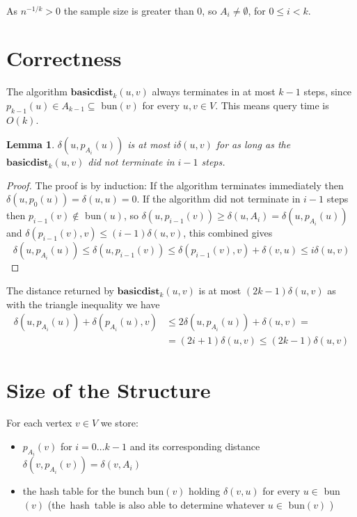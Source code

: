 \documentclass[shortabstract, lic, english]{iithesis}
\theoremstyle{definition} \newtheorem{definition}{Definition}[chapter]
\theoremstyle{plain} \newtheorem{remark}[definition]{Observation}
\theoremstyle{plain} \newtheorem{theorem}[definition]{Theorem}
\theoremstyle{plain} \newtheorem{lemma}[definition]{Lemma}
\theoremstyle{plain} \newtheorem{conjecture}[definition]{Conjecture}
\begin{document}
~

As $n^{-1/k} > 0$ the sample size is greater than $0$, so $A_{i} \neq \emptyset$, for $0 \leq i < k$.

\section{Correctness}

The algorithm $\mathbf{basicdist}_k(u, v)$ always terminates in at most $k-1$ steps,
since $p_{k-1}(u) \in A_{k-1} \subseteq $ bun$(v)$ for every $u,v \in V$.
This means query time is $O(k)$.

\begin{lemma}
$\delta(u, p_{A_i}(u))$ is at most $i\delta(u,v)$
for as long as the $\mathbf{basicdist}_k(u, v)$ did not terminate in $i-1$ steps.
\end{lemma}
\begin{proof} 
The proof is by induction:
If the algorithm terminates immediately then $\delta(u, p_0(u)) = \delta(u, u) = 0$.
If the algorithm did not terminate in $i-1$ steps then 
$p_{i-1}(v) \notin $ bun$(u)$, so
$\delta(u, p_{i-1}(v)) \geq \delta(u, A_{i}) = \delta(u, p_{A_i}(u))$ and
$\delta(p_{i-1}(v), v) \leq (i-1)\delta(u, v)$, this combined gives
$$\delta(u, p_{A_i}(u)) \leq \delta(u, p_{i-1}(v)) \leq \delta(p_{i-1}(v), v) + \delta(v, u) \leq i\delta(u, v)$$
\end{proof}

The distance returned by $\mathbf{basicdist}_k(u, v)$ is at most $(2k - 1)\delta(u,v)$ as
with the triangle inequality we have
\begin{align}
    \delta(u,p_{A_i}(u)) + \delta( p_{A_i}(u), v) &\leq 2\delta(u,  p_{A_i}(u)) + \delta(u,v) = \nonumber \\
    &= (2i + 1)\delta(u,v) \leq (2k - 1)\delta(u,v) \nonumber
\end{align}


\section{Size of the Structure}

For each vertex $v \in V$ we store:
\begin{itemize}
    \item $p_{A_i}(v)$ for $i=0 \ldots k-1$ and its corresponding distance 
    $\delta(v, p_{A_i}(v)) = \delta(v, A_i)$
    \item the hash table for the bunch bun$(v)$ holding $\delta(v, u)$ for every $u \in $ bun$(v)$
    (the~hash~table is also able to determine whatever $u \in $ bun$(v)$ )
\end{itemize}
\end{document}
